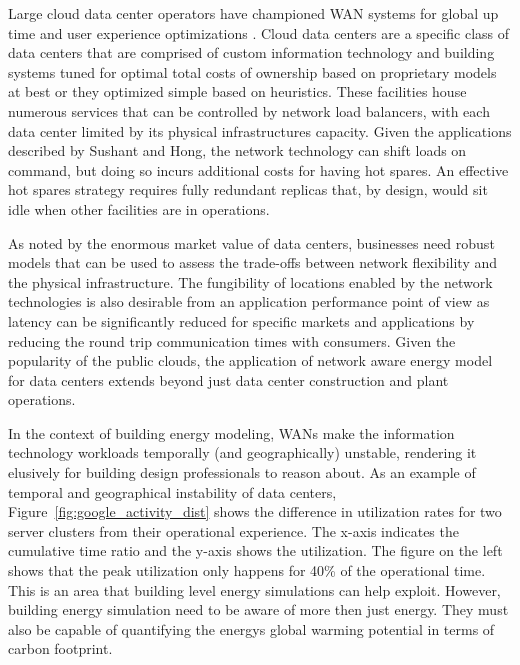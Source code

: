 \documentclass[twocolumn, a4paper,10pt]{article}
\begin{document}
Large cloud data center operators have championed WAN systems for global up time and user experience optimizations \citep{sushant13} \citep{hong13}. Cloud data centers are a specific class of data centers that are comprised of custom information technology and building systems tuned for optimal total costs of ownership based on proprietary models at best or they optimized simple based on heuristics. These facilities house numerous services that can be controlled by network load balancers, with each data center limited by its physical infrastructure\textsc{}s capacity. Given the applications described by Sushant and Hong, the network technology can shift loads on command, but doing so incurs additional costs for having hot spares. An effective hot spares strategy requires fully redundant replicas that, by design, would sit idle when other facilities are in operations. 

As noted by the enormous market value of data centers, businesses need robust models that can be used to assess the trade-offs between network flexibility and the physical infrastructure. The fungibility of locations enabled by the network technologies is also desirable from an application performance point of view as latency can be significantly reduced for specific markets and applications by reducing the round trip communication times with consumers. Given the popularity of the public clouds, the application of network aware energy model for data centers extends beyond just data center construction and plant operations.   

In the context of building energy modeling, WAN\textsc{}s make the information technology workloads temporally (and geographically) unstable, rendering it elusively for building design professionals to reason about. As an example of temporal and geographical instability of data centers, Figure~\ref{fig:google_activity_dist} \citep{barroso18} shows the difference in utilization rates for two server clusters from their operational experience. The x-axis indicates the cumulative time ratio and the y-axis shows the utilization. The figure on the left shows that the peak utilization only happens for 40\% of the operational time. This is an area that building level energy simulations can help exploit. However, building energy simulation need to be aware of more then just energy. They must also be capable of quantifying the energy\textsc{}s global warming potential in terms of carbon footprint.
\end{document}
